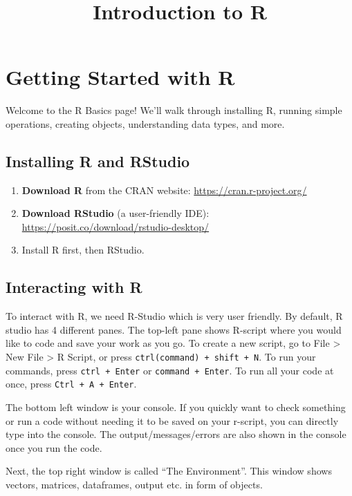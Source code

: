\documentclass[
]{article}
\title{Introduction to R}
\author{}
\date{\vspace{-2.5em}}
\providecommand{\tightlist}{%
  \setlength{\itemsep}{0pt}\setlength{\parskip}{0pt}}
\begin{document}
\maketitle

\section{Getting Started with R}\label{getting-started-with-r}

Welcome to the R Basics page! We'll walk through installing R, running
simple operations, creating objects, understanding data types, and more.

\subsection{Installing R and RStudio}\label{installing-r-and-rstudio}

\begin{enumerate}
\def\labelenumi{\arabic{enumi}.}
\tightlist
\item
  \textbf{Download R} from the CRAN website:
  \url{https://cran.r-project.org/}
\item
  \textbf{Download RStudio} (a user-friendly IDE):
  \url{https://posit.co/download/rstudio-desktop/}
\item
  Install R first, then RStudio.
\end{enumerate}

\subsection{Interacting with R}\label{interacting-with-r}

To interact with R, we need R-Studio which is very user friendly. By
default, R studio has 4 different panes. The top-left pane shows
R-script where you would like to code and save your work as you go. To
create a new script, go to File \textgreater{} New File \textgreater{} R
Script, or press \texttt{ctrl(command)\ +\ shift\ +\ N}. To run your
commands, press \texttt{ctrl\ +\ Enter} or \texttt{command\ +\ Enter}.
To run all your code at once, press \texttt{Ctrl\ +\ A\ +\ Enter}.

The bottom left window is your console. If you quickly want to check
something or run a code without needing it to be saved on your r-script,
you can directly type into the console. The output/messages/errors are
also shown in the console once you run the code.

Next, the top right window is called ``The Environment''. This window
shows vectors, matrices, dataframes, output etc. in form of objects.
\end{document}
